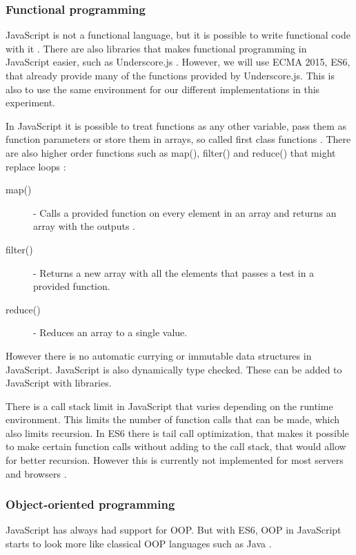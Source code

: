 \documentclass {article}
\begin{document}
\subsubsection{Functional programming}
\label{sec:js-fp}
JavaScript is not a functional language, but it is possible to write functional code with it \cite{drboolean}. There are also libraries that makes functional programming in JavaScript easier, such as Underscore.js \cite{underscorejs} \cite{fogus}. However, we will use ECMA 2015, ES6, that already provide many of the functions provided by Underscore.js. This is also to use the same environment for our different implementations in this experiment.

In JavaScript it is possible to treat functions as any other variable, pass them as function parameters or store them in arrays, so called first class functions \cite{drboolean}. There are also higher order functions such as map(), filter() and reduce() that might replace loops \cite{grady}:

\begin{description}
\item [map()] - Calls a provided function on every element in an array and returns an array with the outputs \cite{jsref}.
\item [filter()] - Returns a new array with all the elements that passes a test in a provided function. 
\item [reduce()] - Reduces an array to a single value.
\end{description}

However there is no automatic currying or immutable data structures in JavaScript. JavaScript is also dynamically type checked. These can be added to JavaScript with libraries.

There is a call stack limit in JavaScript that varies depending on the runtime environment. This limits the number of function calls that can be made, which also limits recursion. In ES6 there is tail call optimization, that makes it possible to make certain function calls without adding to the call stack, that would allow for better recursion. However this is currently not implemented for most servers and browsers \cite{ecma6table}.
\subsubsection{Object-oriented programming}
JavaScript has always had support for OOP. But 
with ES6, OOP in JavaScript starts to look more like classical OOP languages such as Java \cite{ecmacompare}.
\end{document}
